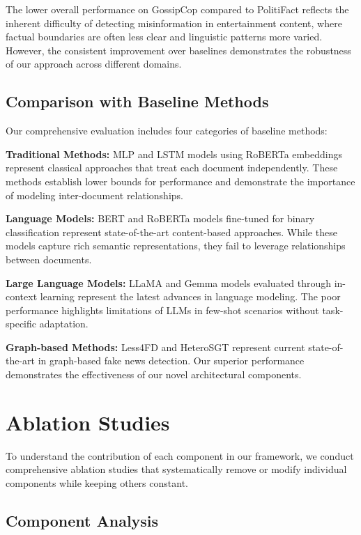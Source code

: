 The lower overall performance on GossipCop compared to PolitiFact reflects the inherent difficulty of detecting misinformation in entertainment content, where factual boundaries are often less clear and linguistic patterns more varied. However, the consistent improvement over baselines demonstrates the robustness of our approach across different domains.

\subsection{Comparison with Baseline Methods}

Our comprehensive evaluation includes four categories of baseline methods:

\textbf{Traditional Methods:} MLP and LSTM models using RoBERTa embeddings represent classical approaches that treat each document independently. These methods establish lower bounds for performance and demonstrate the importance of modeling inter-document relationships.

\textbf{Language Models:} BERT and RoBERTa models fine-tuned for binary classification represent state-of-the-art content-based approaches. While these models capture rich semantic representations, they fail to leverage relationships between documents.

\textbf{Large Language Models:} LLaMA and Gemma models evaluated through in-context learning represent the latest advances in language modeling. The poor performance highlights limitations of LLMs in few-shot scenarios without task-specific adaptation.

\textbf{Graph-based Methods:} Less4FD and HeteroSGT represent current state-of-the-art in graph-based fake news detection. Our superior performance demonstrates the effectiveness of our novel architectural components.

\section{Ablation Studies}

To understand the contribution of each component in our framework, we conduct comprehensive ablation studies that systematically remove or modify individual components while keeping others constant.

\subsection{Component Analysis}

